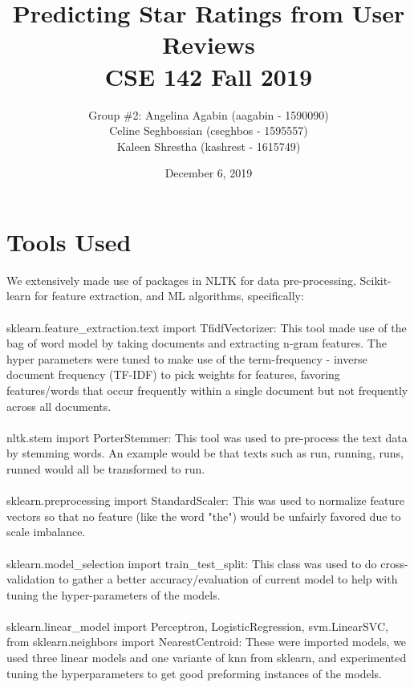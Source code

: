 \documentclass{article}
\title{Predicting Star Ratings from User Reviews\\CSE 142 Fall 2019}
\date{December 6, 2019}
\author{Group \#2: Angelina Agabin (aagabin - 1590090)  \\ Celine Seghbossian (cseghbos - 1595557) \\ Kaleen Shrestha (kashrest - 1615749)}
\begin{document}
\maketitle

\section{Tools Used}
We extensively made use of packages in NLTK for data pre-processing, Scikit-learn for feature extraction,  and ML algorithms, specifically:\\
\\sklearn.feature\_extraction.text import TfidfVectorizer: This tool made use of the bag of word model by taking documents and extracting n-gram features. The hyper parameters were tuned to make use of the term-frequency - inverse document frequency (TF-IDF) to pick weights for features, favoring features/words that occur frequently within a single document but not frequently across all documents.\\
\\nltk.stem import PorterStemmer: This tool was used to pre-process the text data by stemming words. An example would be that texts such as run, running, runs, runned would all be transformed to run.\\
\\sklearn.preprocessing import StandardScaler: This was used to normalize feature vectors so that no feature (like the word "the") would be unfairly favored due to scale imbalance.\\
\\sklearn.model\_selection import train\_test\_split: This class was used to do cross-validation to gather a better accuracy/evaluation of current model to help with tuning the hyper-parameters of the models.\\
\\sklearn.linear\_model import Perceptron, LogisticRegression, svm.LinearSVC, from sklearn.neighbors import NearestCentroid: These were imported models, we used three linear models and one variante of knn from sklearn, and experimented tuning the hyperparameters to get good preforming instances of the models.
\end{document}
